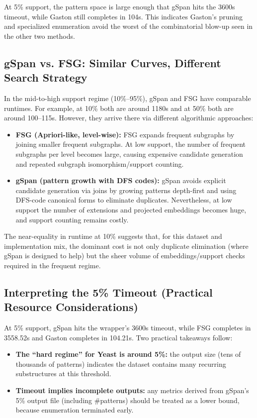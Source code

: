 \documentclass[11pt]{article}
\begin{document}
At 5\% support, the pattern space is large enough that gSpan hits the 3600s timeout, while Gaston still completes in 104s. This indicates Gaston’s pruning and specialized enumeration avoid the worst of the combinatorial blow-up seen in the other two methods.

\subsection{gSpan vs. FSG: Similar Curves, Different Search Strategy}

In the mid-to-high support regime (10\%--95\%), gSpan and FSG have comparable runtimes.
For example, at 10\% both are around 1180s and at 50\% both are around 100--115s.
However, they arrive there via different algorithmic approaches:

\begin{itemize}
	\item \textbf{FSG (Apriori-like, level-wise):} FSG expands frequent subgraphs by joining smaller frequent subgraphs. At low support, the number of frequent subgraphs per level becomes large, causing expensive candidate generation and repeated subgraph isomorphism/support counting.
	\item \textbf{gSpan (pattern growth with DFS codes):} gSpan avoids explicit candidate generation via joins by growing patterns depth-first and using DFS-code canonical forms to eliminate duplicates. Nevertheless, at low support the number of extensions and projected embeddings becomes huge, and support counting remains costly.
\end{itemize}

The near-equality in runtime at 10\% suggests that, for this dataset and implementation mix, the dominant cost is not only duplicate elimination (where gSpan is designed to help) but the sheer volume of embeddings/support checks required in the frequent regime.

\subsection{Interpreting the 5\% Timeout (Practical Resource Considerations)}

At 5\% support, gSpan hits the wrapper's 3600s timeout, while FSG completes in 3558.52s and Gaston completes in 104.21s.
Two practical takeaways follow:
\begin{itemize}
	\item \textbf{The ``hard regime'' for Yeast is around 5\%:} the output size (tens of thousands of patterns) indicates the dataset contains many recurring substructures at this threshold.
	\item \textbf{Timeout implies incomplete outputs:} any metrics derived from gSpan's 5\% output file (including \#patterns) should be treated as a lower bound, because enumeration terminated early.
\end{itemize}
\end{document}
